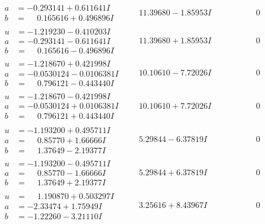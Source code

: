 \documentclass[1p]{elsarticle_modified}
\theoremstyle{definition}
\begin{document}
$$\begin{array}{c|c|c}
\begin{aligned}
a &= -0.293141 + 0.611641 I \\
b &= \phantom{-}0.165616 + 0.496896 I\end{aligned}
 & \phantom{-}11.39680 - 1.85953 I & \phantom{-0.000000 } 0 \\ \hline\begin{aligned}
u &= -1.219230 - 0.410203 I \\
a &= -0.293141 - 0.611641 I \\
b &= \phantom{-}0.165616 - 0.496896 I\end{aligned}
 & \phantom{-}11.39680 + 1.85953 I & \phantom{-0.000000 } 0 \\ \hline\begin{aligned}
u &= -1.218670 + 0.421998 I \\
a &= -0.0530124 - 0.0106381 I \\
b &= \phantom{-}0.796121 - 0.443440 I\end{aligned}
 & \phantom{-}10.10610 - 7.72026 I & \phantom{-0.000000 } 0 \\ \hline\begin{aligned}
u &= -1.218670 - 0.421998 I \\
a &= -0.0530124 + 0.0106381 I \\
b &= \phantom{-}0.796121 + 0.443440 I\end{aligned}
 & \phantom{-}10.10610 + 7.72026 I & \phantom{-0.000000 } 0 \\ \hline\begin{aligned}
u &= -1.193200 + 0.495711 I \\
a &= \phantom{-}0.85770 + 1.66666 I \\
b &= \phantom{-}1.37649 - 2.19377 I\end{aligned}
 & \phantom{-}5.29844 - 6.37819 I & \phantom{-0.000000 } 0 \\ \hline\begin{aligned}
u &= -1.193200 - 0.495711 I \\
a &= \phantom{-}0.85770 - 1.66666 I \\
b &= \phantom{-}1.37649 + 2.19377 I\end{aligned}
 & \phantom{-}5.29844 + 6.37819 I & \phantom{-0.000000 } 0 \\ \hline\begin{aligned}
u &= \phantom{-}1.190870 + 0.503297 I \\
a &= -2.33474 + 1.75949 I \\
b &= -1.22260 - 3.21110 I\end{aligned}
 & \phantom{-}3.25616 + 8.43967 I & \phantom{-0.000000 } 0 \\ \hline\begin{aligned}

\end{aligned}
\end{array}$$
\end{document}
